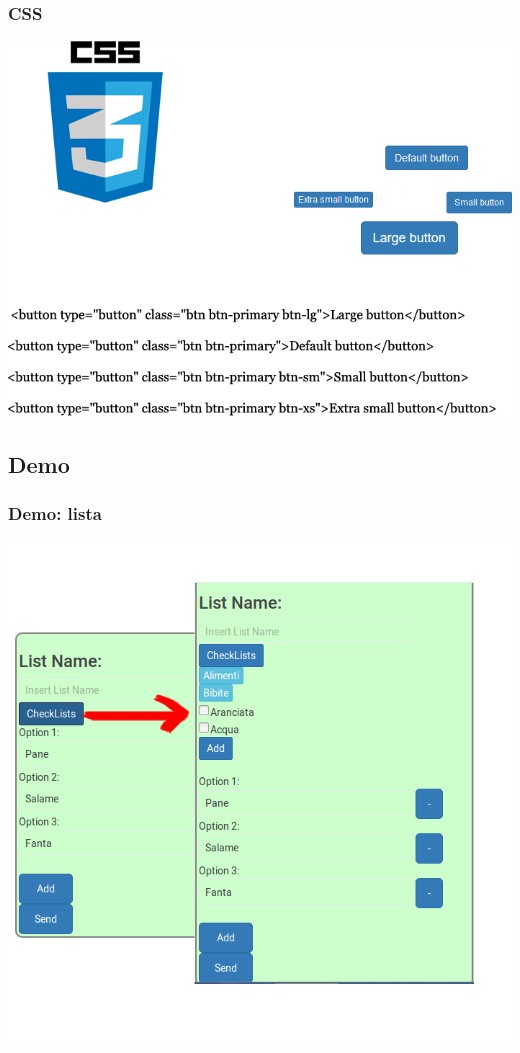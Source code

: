 \begin{frame}
	\frametitle{CSS}
	\includegraphics[scale=0.50]{img/css.png}
\end{frame}

\subsection{Demo}
\begin{frame}
	\frametitle{Demo: lista}
	\includegraphics[scale=0.25]{img/demo.png}
\end{frame}

